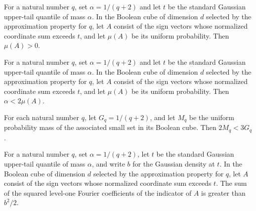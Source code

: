 \begin{theorem}
\label{FABL.fknOptimalitySmallSetMass_pos}
\leanok
{}
For a natural number $q$, set $\alpha=1/(q+2)$ and let $t$ be the standard Gaussian
upper-tail quantile of mass $\alpha$. In the Boolean cube of dimension $d$ selected by
the approximation property for $q$, let $A$ consist of the sign vectors whose normalized
coordinate sum exceeds $t$, and let $\mu(A)$ be its uniform probability. Then
$\mu(A)>0$.
\end{theorem}

\begin{theorem}
\label{FABL.fknOptimalityGaussianMass_lt_two_mul_smallSetMass}
\leanok
{}
For a natural number $q$, set $\alpha=1/(q+2)$ and let $t$ be the standard Gaussian
upper-tail quantile of mass $\alpha$. In the Boolean cube of dimension $d$ selected by
the approximation property for $q$, let $A$ consist of the sign vectors whose normalized
coordinate sum exceeds $t$, and let $\mu(A)$ be its uniform probability. Then
$\alpha<2\mu(A)$.
\end{theorem}

\begin{theorem}
\label{FABL.two_mul_fknOptimalitySmallSetMass_lt_three_mul_gaussianMass}
\leanok
{}
For each natural number $q$, let $G_q=1/(q+2)$, and let $M_q$ be the uniform probability
mass of the associated small set in its Boolean cube. Then $2M_q<3G_q$.
\end{theorem}

\begin{theorem}
\label{FABL.fknOptimalitySmallSetWeight_gt_half_boundary_sq}
\leanok
{}
For a natural number $q$, set $\alpha=1/(q+2)$, let $t$ be the standard Gaussian
upper-tail quantile of mass $\alpha$, and write $b$ for the Gaussian density at $t$. In
the Boolean cube of dimension $d$ selected by the approximation property for $q$, let
$A$ consist of the sign vectors whose normalized coordinate sum exceeds $t$. The sum of
the squared level-one Fourier coefficients of the indicator of $A$ is greater than
$b^2/2$.
\end{theorem}

